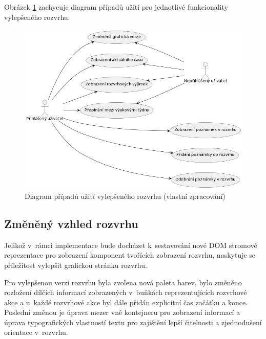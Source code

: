 Obrázek \ref{fig:usecase-rozvrh} zachycuje diagram případů užití pro jednotlivé funkcionality vylepšeného rozvrhu.

\begin{figure}[htbp!]\centering
    \includegraphics[width=\textwidth]{img/uc-rozvrh.png}
    \caption{Diagram případů užití vylepšeného rozvrhu (vlastní zpracování)}
    \label{fig:usecase-rozvrh}
\end{figure}

\subsection{Změněný vzhled rozvrhu}

Jelikož v~rámci implementace bude docházet k~sestavování nové DOM stromové reprezentace pro zobrazení komponent tvořících zobrazení rozvrhu, naskytuje se příležitost vylepšit grafickou stránku rozvrhu. 

Pro vylepšenou verzi rozvrhu byla zvolena nová paleta barev, bylo změněno rozložení dílčích informací zobrazených v~buňkách reprezentujících rozvrhové akce a u~každé rozvrhové akce byl dále přidán explicitní čas začátku a konce. Poslední změnou je úprava mezer vně kontejneru pro zobrazení informací a úprava typografických vlastností textu pro zajištění lepší čitelnosti a zjednodušení orientace v~rozvrhu.

